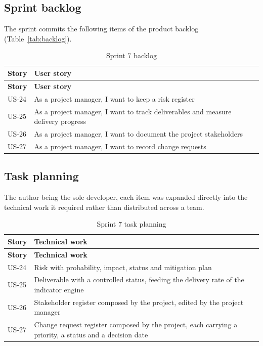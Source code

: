\subsection{Sprint backlog}
The sprint commits the following items of the product backlog (Table~\ref{tab:backlog}).

\begin{longtable}{|m{1.6cm}|m{12.4cm}|}
\caption{Sprint 7 backlog}\label{tab:sb7}\\
\hline
\textbf{Story} & \textbf{User story} \\
\hline
\endfirsthead
\hline
\textbf{Story} & \textbf{User story} \\
\hline
\endhead
\endfoot
\endlastfoot
\hline
US-24 & As a project manager, I want to keep a risk register \\
\hline
US-25 & As a project manager, I want to track deliverables and measure delivery progress \\
\hline
US-26 & As a project manager, I want to document the project stakeholders \\
\hline
US-27 & As a project manager, I want to record change requests \\
\hline
\end{longtable}

\subsection{Task planning}
The author being the sole developer, each item was expanded directly into the technical work it
required rather than distributed across a team.

\begin{longtable}{|m{1.6cm}|m{12.4cm}|}
\caption{Sprint 7 task planning}\label{tab:tp7}\\
\hline
\textbf{Story} & \textbf{Technical work} \\
\hline
\endfirsthead
\hline
\textbf{Story} & \textbf{Technical work} \\
\hline
\endhead
\endfoot
\endlastfoot
\hline
US-24 & Risk with probability, impact, status and mitigation plan \\
\hline
US-25 & Deliverable with a controlled status, feeding the delivery rate of the indicator engine \\
\hline
US-26 & Stakeholder register composed by the project, edited by the project manager \\
\hline
US-27 & Change request register composed by the project, each carrying a priority, a status and a decision date \\
\hline
\end{longtable}

